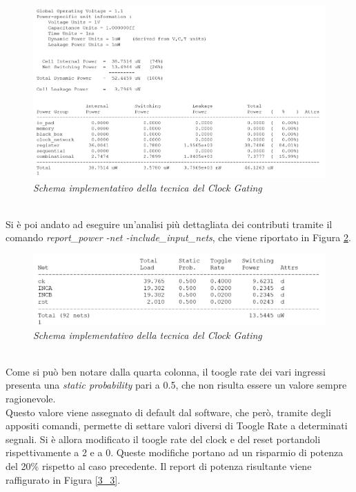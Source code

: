 \begin{figure}[!htb]
	\centering
	\includegraphics[scale=0.8]{immagini/3_1}
	\caption{\textit{Schema implementativo della tecnica del Clock Gating}}
	\label{3_1}
\end{figure}
\\
Si è poi andato ad eseguire un'analisi più dettagliata dei contributi tramite il comando \textit{report\_power -net -include\_input\_nets}, che viene riportato in Figura \ref{3_2}. \\
\begin{figure}[!htb]
	\centering
	\includegraphics[scale=0.8]{immagini/3_2}
	\caption{\textit{Schema implementativo della tecnica del Clock Gating}}
	\label{3_2}
\end{figure}
\\
Come si può ben notare dalla quarta colonna, il toogle rate dei vari ingressi presenta una \textit{static probability} pari a 0.5, che non risulta essere un valore sempre ragionevole. \\
Questo valore viene assegnato di default dal software, che però, tramite degli appositi comandi, permette di settare valori diversi di Toogle Rate a determinati segnali. Si è allora modificato il toogle rate del clock e del reset portandoli rispettivamente a 2 e a 0. Queste modifiche portano ad un risparmio di potenza del 20\% rispetto al caso precedente. Il report di potenza risultante viene raffigurato in Figura \ref{3_3}. \\
